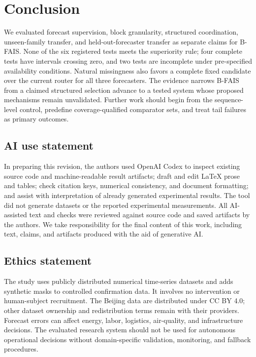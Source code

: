 \documentclass{article}
\newcommand{\bfais}{\textsc{B-FAIS}\xspace}
\begin{document}
\section{Conclusion}
\label{sec:conclusion}

We evaluated forecast supervision, block granularity, structured coordination, unseen-family transfer, and held-out-forecaster transfer as separate claims for \bfais. None of the six registered tests meets the superiority rule; four complete tests have intervals crossing zero, and two tests are incomplete under pre-specified availability conditions. Natural missingness also favors a complete fixed candidate over the current router for all three forecasters. The evidence narrows \bfais from a claimed structured selection advance to a tested system whose proposed mechanisms remain unvalidated. Further work should begin from the sequence-level control, predefine coverage-qualified comparator sets, and treat tail failures as primary outcomes.

\subsection*{AI use statement}
In preparing this revision, the authors used OpenAI Codex to inspect existing source code and machine-readable result artifacts; draft and edit LaTeX prose and tables; check citation keys, numerical consistency, and document formatting; and assist with interpretation of already generated experimental results. The tool did not generate datasets or the reported experimental measurements. All AI-assisted text and checks were reviewed against source code and saved artifacts by the authors. We take responsibility for the final content of this work, including text, claims, and artifacts produced with the aid of generative AI.

\subsection*{Ethics statement}
The study uses publicly distributed numerical time-series datasets and adds synthetic masks to controlled confirmation data. It involves no intervention or human-subject recruitment. The Beijing data are distributed under CC BY 4.0; other dataset ownership and redistribution terms remain with their providers. Forecast errors can affect energy, labor, logistics, air-quality, and infrastructure decisions. The evaluated research system should not be used for autonomous operational decisions without domain-specific validation, monitoring, and fallback procedures.
\end{document}
